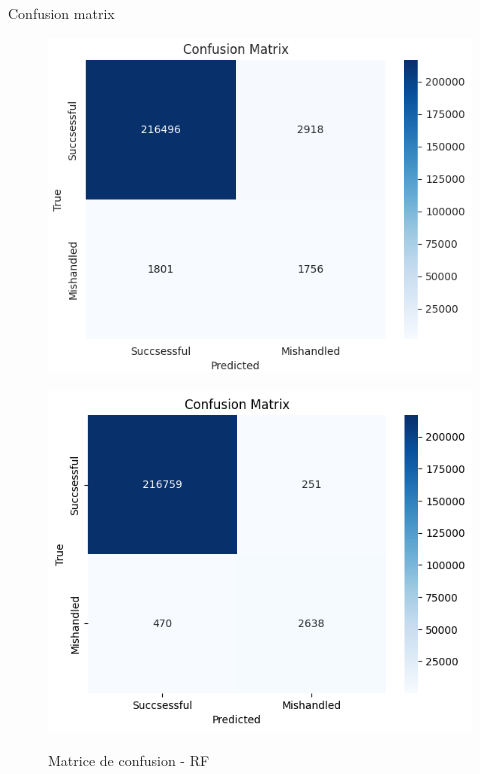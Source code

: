 \documentclass{beamer}
\begin{document}
\begin{frame}{Confusion matrix}
    \begin{figure}
    \begin{minipage}[c]{0.45\linewidth}
    \includegraphics[width=1\textwidth]{Confusion_matrix_Model 1.png}\\
    \caption{Matrice de confusion - LR}
\end{minipage}
\hfill
\begin{minipage}[c]{0.45\linewidth}
    \includegraphics[width=1\textwidth]{Confusion_matrix_Model 6.png}\\
    \caption{Matrice de confusion - RF}
\end{minipage}
\end{figure}
\end{frame}
\end{document}
